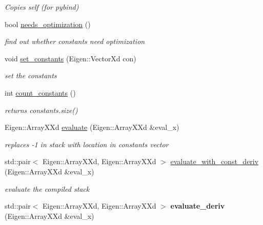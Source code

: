 \begin{DoxyCompactItemize}
\begin{DoxyCompactList}\small\item\em Copies self (for pybind) \end{DoxyCompactList}\item 
bool \hyperlink{classAcyclicGraph_a4ca2be7ca5d026f3535634c94535e342}{needs\+\_\+optimization} ()
\begin{DoxyCompactList}\small\item\em find out whether constants need optimization \end{DoxyCompactList}\item 
void \hyperlink{classAcyclicGraph_a11aacda6eb5659d132cf03ab05eef8bd}{set\+\_\+constants} (Eigen\+::\+Vector\+Xd con)
\begin{DoxyCompactList}\small\item\em set the constants \end{DoxyCompactList}\item 
int \hyperlink{classAcyclicGraph_a0f430cfe917cb859478a595560acd590}{count\+\_\+constants} ()
\begin{DoxyCompactList}\small\item\em returns constants.\+size() \end{DoxyCompactList}\item 
Eigen\+::\+Array\+X\+Xd \hyperlink{classAcyclicGraph_a03140f2d30f36a447bc920364bcaf902}{evaluate} (Eigen\+::\+Array\+X\+Xd \&eval\+\_\+x)
\begin{DoxyCompactList}\small\item\em replaces -\/1 in stack with location in constants vector \end{DoxyCompactList}\item 
std\+::pair$<$ Eigen\+::\+Array\+X\+Xd, Eigen\+::\+Array\+X\+Xd $>$ \hyperlink{classAcyclicGraph_ae0165998884415c340ef42f5519ee378}{evaluate\+\_\+with\+\_\+const\+\_\+deriv} (Eigen\+::\+Array\+X\+Xd \&eval\+\_\+x)
\begin{DoxyCompactList}\small\item\em evaluate the compiled stack \end{DoxyCompactList}\item 
std\+::pair$<$ Eigen\+::\+Array\+X\+Xd, Eigen\+::\+Array\+X\+Xd $>$ {\bfseries evaluate\+\_\+deriv} (Eigen\+::\+Array\+X\+Xd \&eval\+\_\+x)\hypertarget{classAcyclicGraph_a54149fd647d6d2cbac480cbc9bafe2bb}{}\label{classAcyclicGraph_a54149fd647d6d2cbac480cbc9bafe2bb}


\end{DoxyCompactItemize}
